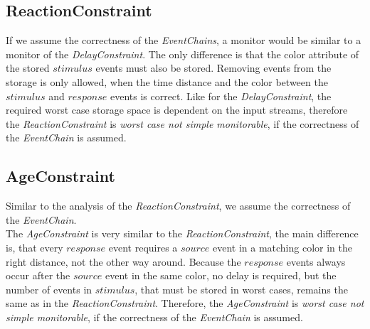 \subsection{ReactionConstraint}
	If we assume the correctness of the \textit{EventChains}, a monitor would be similar to a monitor of the \textit{DelayConstraint}. The only difference is that the color attribute of the stored $stimulus$ events must also be stored. Removing events from the storage is only allowed, when the time distance and the color between the $stimulus$ and $response$ events is correct.  Like for the \textit{DelayConstraint}, the required worst case storage space is dependent on the input streams, therefore the \textit{ReactionConstraint} is \textit{worst case not simple monitorable}, if the correctness of the \textit{EventChain} is assumed.

\subsection{AgeConstraint}
	Similar to the analysis of the \textit{ReactionConstraint}, we assume the correctness of the \textit{EventChain}.\\
	The \textit{AgeConstraint} is very similar to the \textit{ReactionConstraint}, the main difference is, that every $response$ event requires a $source$ event in a matching color in the right distance, not the other way around. Because the $response$ events always occur after the $source$ event in the same color, no delay is required, but the number of events in $stimulus$, that must be stored in worst cases, remains the same as in the \textit{ReactionConstraint}. Therefore, the \textit{AgeConstraint} is \textit{worst case not simple monitorable}, if the correctness of the \textit{EventChain} is assumed.
	
